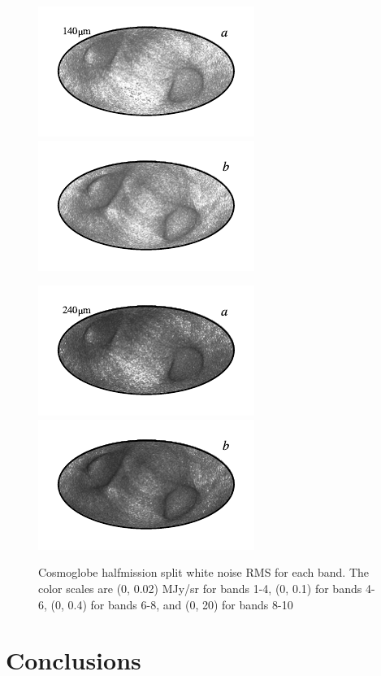 \documentclass{aa}
\begin{document}
\begin{figure}
	\includegraphics{figs/rms_maps/rms_09a_c0001_000019.pdf}\includegraphics{figs/rms_maps/rms_09b_c0001_000019.pdf}
  \vspace*{-0.85cm}

	\includegraphics{figs/rms_maps/rms_10a_c0001_000019.pdf}\includegraphics{figs/rms_maps/rms_10b_c0001_000019.pdf}
  \vspace*{-0.85cm}

	\caption{Cosmoglobe halfmission split white noise RMS for each band. The color scales are (0, 0.02) MJy/sr for bands 1-4, (0, 0.1) for bands 4-6, (0, 0.4) for bands 6-8, and (0, 20) for bands 8-10}
	\label{fig:rms}
\end{figure}

\section{Conclusions}
\end{document}
